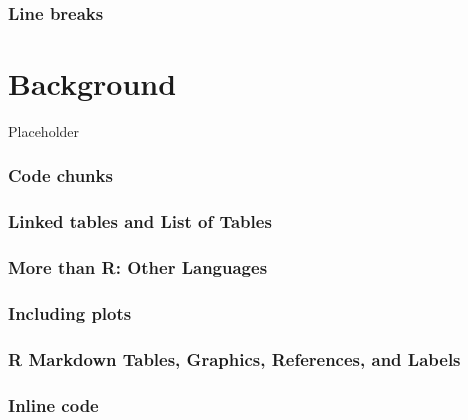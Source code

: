 \documentclass[12pt,oneside]{chicagocapstone}
\begin{document}
\hypertarget{line-breaks}{%
\subsection*{Line breaks}\label{line-breaks}}

\hypertarget{background}{%
\chapter*{Background}\label{background}}

Placeholder

\hypertarget{code-chunks}{%
\subsection*{Code chunks}\label{code-chunks}}

\hypertarget{linked-tables-and-list-of-tables}{%
\subsection*{Linked tables and List of Tables}\label{linked-tables-and-list-of-tables}}

\hypertarget{more-than-r-other-languages}{%
\subsection*{More than R: Other Languages}\label{more-than-r-other-languages}}

\hypertarget{pressure-plot}{%
\subsection*{Including plots}\label{pressure-plot}}

\hypertarget{ref-labels}{%
\subsection*{R Markdown Tables, Graphics, References, and Labels}\label{ref-labels}}

\hypertarget{inline-code}{%
\subsection*{Inline code}\label{inline-code}}
\end{document}
